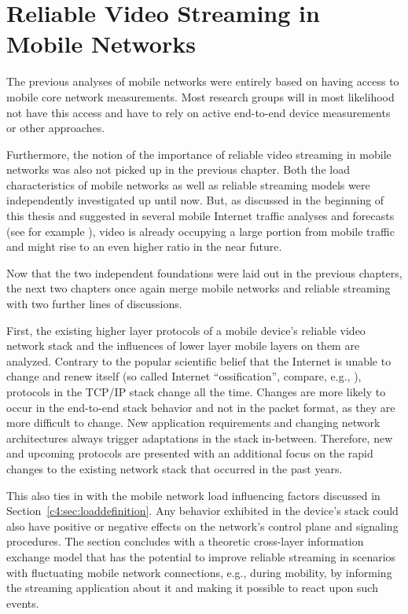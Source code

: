 \chapter{Reliable Video Streaming in Mobile Networks}
\label{chap:mobilestreaming}

The previous analyses of mobile networks were entirely based on having access to mobile core network measurements. Most research groups will in most likelihood not have this access and have to rely on active end-to-end device measurements or other approaches.

Furthermore, the notion of the importance of reliable video streaming in mobile networks was also not picked up in the previous chapter. Both the load characteristics of mobile networks as well as reliable streaming models were independently investigated up until now. But, as discussed in the beginning of this thesis and suggested in several mobile Internet traffic analyses and forecasts (see for example \cite{cisco2014VNI}), video is already occupying a large portion from mobile traffic and might rise to an even higher ratio in the near future.

Now that the two independent foundations were laid out in the previous chapters, the next two chapters once again merge mobile networks and reliable streaming with two further lines of discussions. 

First, the existing higher layer protocols of a mobile device's reliable video network stack and the influences of lower layer mobile layers on them are analyzed. Contrary to the popular scientific belief that the Internet is unable to change and renew itself (so called Internet ``ossification'', compare, e.g., \cite{feldmann2010ossification}), protocols in the \gls{TCP}/\gls{IP} stack change all the time. Changes are more likely to occur in the end-to-end stack behavior and not in the packet format, as they are more difficult to change. New application requirements and changing network architectures always trigger adaptations in the stack in-between. Therefore, new and upcoming protocols are presented with an additional focus on the rapid changes to the existing network stack that occurred in the past years.

This also ties in with the mobile network load influencing factors discussed in Section~\ref{c4:sec:loaddefinition}. Any behavior exhibited in the device's stack could also have positive or negative effects on the network's control plane and signaling procedures. The section concludes with a theoretic cross-layer information exchange model that has the potential to improve reliable streaming in scenarios with fluctuating mobile network connections, e.g., during mobility, by informing the streaming application about it and making it possible to react upon such events.

